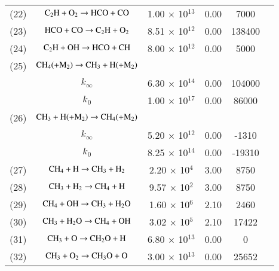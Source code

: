 \documentclass{warpdoc}
\begin{document}
\begin{table}[h]
\begin{center}
\begin{threeparttable}
\begin{tabular}{cccccc}
(22) & $\rm  C_2 H + O_2 \rightarrow HCO +CO $ &1.00 $\times$ 10$^{13}$  & 0.00 &7000 &\cite{caf:1989:refael}\\

(23) & $\rm HCO+CO \rightarrow C_2 H + O_2 $ &8.51 $\times$ 10$^{12}$  & 0.00 &138400 &\cite{caf:1989:refael}\\

(24) & $\rm C_2 H + OH \rightarrow HCO + CH $ &8.00 $\times$ 10$^{12}$  & 0.00 &5000 &\cite{ef:2017:zettervall}\\

(25) & $\rm C H_4 (+M_2) \rightarrow CH_3 + H (+M_2) $  &  &  &  & \cite{rkm:1991:smoke}\tnote{b}\\

  & $k_\infty $ & 6.30 $\times$ 10$^{14}$ &0.00  &104000  &\\

  & $k_{0} $ & 1.00 $\times$ 10$^{17}$ & 0.00 & 86000 &\\
  
(26) & $\rm CH_3 + H (+M_2)  \rightarrow C H_4 (+M_2) $&  &  &  &\cite{rkm:1991:smoke}\tnote{b}\\

  & $k_\infty $ & 5.20 $\times$ 10$^{12}$ &0.00  &-1310  &\\

  & $k_{0} $ & 8.25 $\times$ 10$^{14}$ & 0.00 & -19310 &\\
  
(27) & $\rm C H_4 + H \rightarrow C H_3 + H_2 $ &2.20 $\times$ 10$^{4}$  & 3.00 &8750 &\cite{rkm:1991:smoke}\\  

(28) & $\rm C H_3 + H_2 \rightarrow C H_4 + H $ &9.57 $\times$ 10$^{2}$  & 3.00 &8750 &\cite{rkm:1991:smoke}\\ 

(29) & $\rm C H_4 + OH \rightarrow C H_3 + H_2 O $ &1.60 $\times$ 10$^{6}$  & 2.10 &2460 &\cite{rkm:1991:smoke}\\ 

(30) & $\rm C H_3 + H_2 O \rightarrow C H_4 + OH $ &3.02 $\times$ 10$^{5}$  & 2.10 &17422 &\cite{rkm:1991:smoke}\\ 

(31) & $\rm C H_3 + O \rightarrow C H_2 O + H $ &6.80 $\times$ 10$^{13}$  & 0.00 &0 &\cite{rkm:1991:smoke}\\ 

(32) & $\rm C H_3 + O_2 \rightarrow C H_3 O + O $ &3.00 $\times$ 10$^{13}$  & 0.00 &25652 &\cite{rkm:1991:smoke}\\ 


\end{tabular}
\end{threeparttable}
\end{center}
\end{table}
\end{document}
